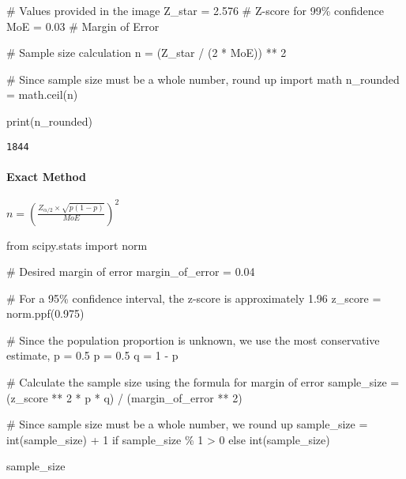 \documentclass[
  letterpaper,
  DIV=11,
  numbers=noendperiod]{scrartcl}
\let\oldparagraph\paragraph
\renewcommand{\paragraph}[1]{\oldparagraph{#1}\mbox{}}
\newenvironment{Shaded}{\begin{snugshade}}{\end{snugshade}}
\newcommand{\BuiltInTok}[1]{\textcolor[rgb]{0.00,0.23,0.31}{#1}}
\newcommand{\CommentTok}[1]{\textcolor[rgb]{0.37,0.37,0.37}{#1}}
\newcommand{\ControlFlowTok}[1]{\textcolor[rgb]{0.00,0.23,0.31}{#1}}
\newcommand{\DecValTok}[1]{\textcolor[rgb]{0.68,0.00,0.00}{#1}}
\newcommand{\FloatTok}[1]{\textcolor[rgb]{0.68,0.00,0.00}{#1}}
\newcommand{\ImportTok}[1]{\textcolor[rgb]{0.00,0.46,0.62}{#1}}
\newcommand{\NormalTok}[1]{\textcolor[rgb]{0.00,0.23,0.31}{#1}}
\newcommand{\OperatorTok}[1]{\textcolor[rgb]{0.37,0.37,0.37}{#1}}
\begin{document}
\begin{Shaded}
\begin{Highlighting}[]
\CommentTok{\# Values provided in the image}
\NormalTok{Z\_star }\OperatorTok{=} \FloatTok{2.576}  \CommentTok{\# Z{-}score for 99\% confidence}
\NormalTok{MoE }\OperatorTok{=} \FloatTok{0.03}      \CommentTok{\# Margin of Error}

\CommentTok{\# Sample size calculation}
\NormalTok{n }\OperatorTok{=}\NormalTok{ (Z\_star }\OperatorTok{/}\NormalTok{ (}\DecValTok{2} \OperatorTok{*}\NormalTok{ MoE)) }\OperatorTok{**} \DecValTok{2}

\CommentTok{\# Since sample size must be a whole number, round up}
\ImportTok{import}\NormalTok{ math}
\NormalTok{n\_rounded }\OperatorTok{=}\NormalTok{ math.ceil(n)}

\BuiltInTok{print}\NormalTok{(n\_rounded)}
\end{Highlighting}
\end{Shaded}

\begin{verbatim}
1844
\end{verbatim}

\hypertarget{exact-method}{%
\paragraph{Exact Method}\label{exact-method}}

\(n = \left( \frac{Z_{\alpha/2} \times \sqrt{p(1-p)}}{MoE} \right)^2\)

\begin{Shaded}
\begin{Highlighting}[]
\ImportTok{from}\NormalTok{ scipy.stats }\ImportTok{import}\NormalTok{ norm}

\CommentTok{\# Desired margin of error}
\NormalTok{margin\_of\_error }\OperatorTok{=} \FloatTok{0.04}

\CommentTok{\# For a 95\% confidence interval, the z{-}score is approximately 1.96}
\NormalTok{z\_score }\OperatorTok{=}\NormalTok{ norm.ppf(}\FloatTok{0.975}\NormalTok{)}

\CommentTok{\# Since the population proportion is unknown, we use the most conservative estimate, p = 0.5}
\NormalTok{p }\OperatorTok{=} \FloatTok{0.5}
\NormalTok{q }\OperatorTok{=} \DecValTok{1} \OperatorTok{{-}}\NormalTok{ p}

\CommentTok{\# Calculate the sample size using the formula for margin of error}
\NormalTok{sample\_size }\OperatorTok{=}\NormalTok{ (z\_score }\OperatorTok{**} \DecValTok{2} \OperatorTok{*}\NormalTok{ p }\OperatorTok{*}\NormalTok{ q) }\OperatorTok{/}\NormalTok{ (margin\_of\_error }\OperatorTok{**} \DecValTok{2}\NormalTok{)}

\CommentTok{\# Since sample size must be a whole number, we round up}
\NormalTok{sample\_size }\OperatorTok{=} \BuiltInTok{int}\NormalTok{(sample\_size) }\OperatorTok{+} \DecValTok{1} \ControlFlowTok{if}\NormalTok{ sample\_size }\OperatorTok{\%} \DecValTok{1} \OperatorTok{\textgreater{}} \DecValTok{0} \ControlFlowTok{else} \BuiltInTok{int}\NormalTok{(sample\_size)}

\NormalTok{sample\_size}
\end{Highlighting}
\end{Shaded}
\end{document}
